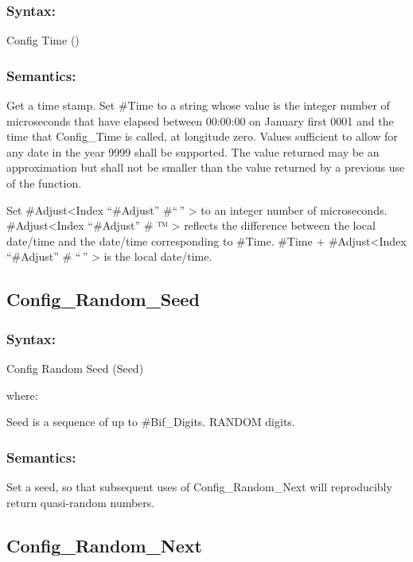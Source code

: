 \subsubsection{Syntax:}\label{syntax-46}

Config Time ()

\subsubsection{Semantics:}\label{semantics-47}

Get a time stamp. Set \#Time to a string whose value is the integer
number of microseconds that have elapsed between 00:00:00 on January
first 0001 and the time that Config\_Time is called, at longitude zero.
Values sufficient to allow for any date in the year 9999 shall be
supported. The value returned may be an approximation but shall not be
smaller than the value returned by a previous use of the function.

Set \#Adjust\textless Index ``\#Adjust'' \#``\,'' \textgreater{} to an
integer number of microseconds. \#Adjust\textless Index ``\#Adjust'' \#
™ \textgreater{} reflects the difference between the local date/time and
the date/time corresponding to \#Time. \#Time + \#Adjust\textless Index
``\#Adjust'' \# ``\,'' \textgreater{} is the local date/time.

\subsection{Config\_Random\_Seed}\label{config_random_seed}

\subsubsection{Syntax:}\label{syntax-47}

Config Random Seed (Seed)

where:

Seed is a sequence of up to \#Bif\_Digits. RANDOM digits.

\subsubsection{Semantics:}\label{semantics-48}

Set a seed, so that subsequent uses of Config\_Random\_Next will
reproducibly return quasi-random numbers.

\subsection{Config\_Random\_Next}\label{config_random_next}


